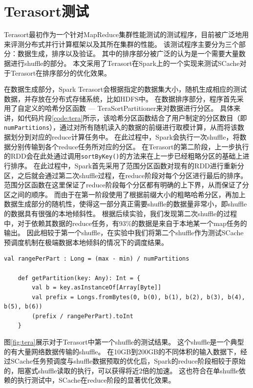 \section{Terasort测试}

Terasort最初作为一个针对MapReduce集群性能测试的测试程序，目前被广泛地用来评测分布式并行计算框架以及其所在集群的性能。
该测试程序主要分为三个部分：数据生成，排序以及验证。
其中的排序部分被广泛的认为是一个需要大量数据进行shuffle的部分。
本文采用了Terasort在Spark上的一个实现\cite{terasort}来测试SCache对于Terasort在排序部分的优化效果。

在数据生成部分，Spark Terasort会根据指定的数据集大小，随机生成相应的测试数据，并存放在分布式存储系统，比如HDFS中。
在数据排序部分，程序首先采用了自定义的哈希分区函数 --- TeraSortPartitioner来对数据进行分区。
具体来讲，如代码片段\ref{code:tera}所示，该哈希分区函数结合了用户制定的分区数目（即\verb|numPartitions|），通过对所有随机读入的数据的前缀进行取模计算，从而将该数据划分到对应的reduce计算任务中。
在此过程中，Spark会执行一次shuffle，将数据分别传输到各个reduce任务所对应的分区。
在Terasort的第二阶段，上一步执行的RDD会在此处通过调用\verb|sortByKey()|的方法来在上一步已经粗略分区的基础上进行排序。
在此过程中，Spark首先采用了范围分区函数对现有的RDD进行重新分区，之后就会通过第二次shuffle过程，在reduce阶段对每个分区进行最后的排序。
范围分区函数在这里保证了reduce阶段每个分区都有明确的上下界，从而保证了分区之间的顺序。
而由于在第一阶段使用了根据前缀大小的粗略哈希分区，再加上数据生成部分的随机性，使得这一部分真正需要shuffle的数据量非常小，即shuffle的数据具有很强的本地倾斜性。
根据后续实验，我们发现第二次shuffle的过程中，对于依赖其数据的reduce任务，有93\%的数据是来自于本地某一个map任务的输出。
因此相较于第一个shuffle，在实验中我们将第二个shuffle作为测试SCache预调度机制在极端数据本地倾斜的情况下的调度结果。

\begin{lstlisting}[style={myScalastyle}, caption={Terasort哈希分区函数代码(Scala)}, label={code:tera}]
    val rangePerPart : Long = (max - min) / numPartitions

    def getPartition(key: Any): Int = {
        val b = key.asInstanceOf[Array[Byte]]
        val prefix = Longs.fromBytes(0, b(0), b(1), b(2), b(3), b(4), b(5), b(6))
        (prefix / rangePerPart).toInt
    }
\end{lstlisting}

图\ref{fig:tera}展示对于Terasort中第一个shuffle的测试结果。
这个shuffle是一个典型的有大量网络数据传输的shuffle。
在10GB到200GB的不同体积的输入数据下，经过SCache任务预调度与shuffle数据预取的优化后，Spark的reduce阶段相较于原始的，阻塞式shuffle读取的执行，可以获得将近2倍的加速。
这也符合在单shuffle依赖的执行测试中，SCache在reduce阶段的显著优化效果。

